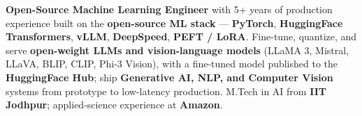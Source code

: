 \documentclass[letter,10pt]{article}
\begin{document}

\textbf{Open-Source Machine Learning Engineer} with 5+ years of production experience built on the \textbf{open-source ML stack} — \textbf{PyTorch}, \textbf{HuggingFace Transformers}, \textbf{vLLM}, \textbf{DeepSpeed}, \textbf{PEFT / LoRA}.
Fine-tune, quantize, and serve \textbf{open-weight LLMs and vision-language models} (LLaMA 3, Mistral, LLaVA, BLIP, CLIP, Phi-3 Vision), with a fine-tuned model published to the \textbf{HuggingFace Hub}; ship \textbf{Generative AI, NLP, and Computer Vision} systems from prototype to low-latency production.
M.Tech in AI from \textbf{IIT Jodhpur}; applied-science experience at \textbf{Amazon}.
\end{document}
